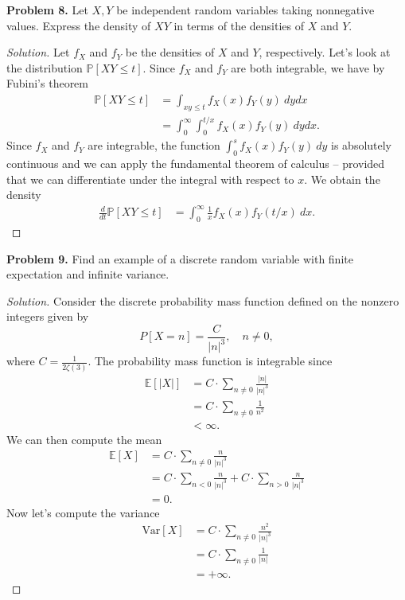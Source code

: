 \documentclass[11pt,letterpaper]{report}
\newcommand{\E}{\mathbb{E}}
\newcommand{\Prob}{\mathbb{P}}
\newcommand{\Var}{\text{Var}}
\newenvironment{solution}
{\begin{proof}[Solution]}
{\end{proof}}
\begin{document}
\noindent\textbf{Problem 8. }
Let $X,Y$ be independent random variables taking nonnegative values. Express the density of $XY$ in terms of the densities of $X$ and $Y$.
\begin{solution}
	Let $f_X$ and $f_Y$ be the densities of $X$ and $Y$, respectively. Let's look at the distribution $\Prob[XY\leq t]$. Since $f_X$ and $f_Y$ are both integrable, we have by Fubini's theorem
	\begin{align*}
		\Prob[XY\leq t] &= \int_{xy\leq t}f_X(x)f_Y(y)\ dydx\\
		&= \int_0^\infty\int_0^{t/x}f_X(x)f_Y(y)\ dydx.
	\end{align*}
	Since $f_X$ and $f_Y$ are integrable, the function $\int_0^sf_X(x)f_Y(y)\ dy$ is absolutely continuous and we can apply the fundamental theorem of calculus -- provided that we can differentiate under the integral with respect to $x$. We obtain the density
	\begin{align*}
		\frac{d}{dt}\Prob[XY\leq t] &= \int_0^\infty \frac{1}{x}f_X(x)f_Y(t/x)\ dx.
	\end{align*}
\end{solution}

\noindent\textbf{Problem 9. }
Find an example of a discrete random variable with finite expectation and infinite variance.
\begin{solution}
	Consider the discrete probability mass function defined on the nonzero integers given by
	\[
	P[X = n] = \frac{C}{|n|^3},\quad n\neq 0,
	\]
	where $C = \frac{1}{2\zeta(3)}$. The probability mass function is integrable since
	\begin{align*}
		\E[|X|] &= C\cdot \sum_{n\neq 0}\frac{|n|}{|n|^3}\\
		&= C\cdot \sum_{n\neq 0}\frac{1}{n^2}\\
		&<\infty.
	\end{align*}
	We can then compute the mean
	\begin{align*}
		\E[X] &= C\cdot \sum_{n\neq 0}\frac{n}{|n|^3}\\
		&= C\cdot \sum_{n<0}\frac{n}{|n|^3} + C\cdot \sum_{n>0}\frac{n}{|n|^3}\\
		&= 0.
	\end{align*}
	Now let's compute the variance
	\begin{align*}
		\Var[X] &= C\cdot \sum_{n\neq 0}\frac{n^2}{|n|^3}\\
		&= C\cdot \sum_{n\neq 0}\frac{1}{|n|}\\
		&= +\infty.
	\end{align*}
\end{solution}
\end{document}
